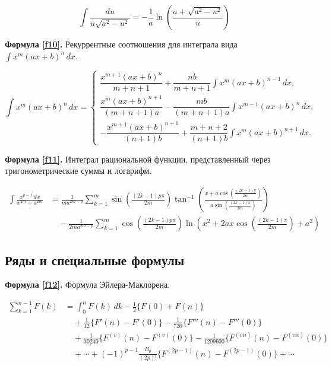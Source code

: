 \documentclass[a4paper,12pt]{article}
\begin{document}
\begin{equation}
\int \frac{du}{u\sqrt{a^2-u^2}}=-\frac{1}{a}\ln\left(\frac{a+\sqrt{a^2-u^2}}{u}\right)
\label{f9}
\end{equation}


\vspace{15pt}
\textbf{Формула \ref{f10}.}
Рекуррентные соотношения для интеграла вида $\int x^m(ax+b)^n\,dx$.

\begin{equation}
\int x^m(ax+b)^n\,dx=\begin{cases}\dfrac{x^{m+1}(ax+b)^n}{m+n+1}
+\dfrac{nb}{m+n+1}\int x^m(ax+b)^{n-1}\,dx, \\[10pt]\dfrac{x^m(ax+b)^{n+1}}{(m+n+1)a}
-\dfrac{mb}{(m+n+1)a}\int x^{m-1}(ax+b)^n\,dx, \\[10pt]
-\dfrac{x^{m+1}(ax+b)^{n+1}}{(n+1)b}
+\dfrac{m+n+2}{(n+1)b}\int x^m(ax+b)^{n+1}\,dx.
\end{cases}
\label{f10}
\end{equation}


\vspace{15pt}
\textbf{Формула \ref{f11}.}
Интеграл рациональной функции, представленный через тригонометрические суммы и логарифм.

\begin{equation}
\begin{split}
\int \frac{x^{p-1}\,dx}{x^{2m}+a^{2m}}&=\frac{1}{m a^{2m-p}}\sum_{k=1}^{m}
\sin\left(\frac{(2k-1)p\pi}{2m}\right)\tan^{-1}\left(\frac{x+a\cos\left(\frac{(2k-1)\pi}{2m}\right)}
{a\sin\left(\frac{(2k-1)\pi}{2m}\right)}\right)\\[8pt]
&\quad-\frac{1}{2m a^{2m-p}}\sum_{k=1}^{m}\cos\left(\frac{(2k-1)p\pi}{2m}\right)
\ln\left(x^2+2ax\cos\left(\frac{(2k-1)\pi}{2m}\right)+a^2\right)
\end{split}
\label{f11}
\end{equation}


\subsection{Ряды и специальные формулы}
\vspace{15pt}
\textbf{Формула \ref{f12}.}
Формула Эйлера-Маклорена.

\begin{equation}
\begin{split}
\sum_{k=1}^{n-1} F(k)&=\int_0^n F(k)\,dk-\frac{1}{2}\{F(0)+F(n)\}\\[6pt]&\quad
+\frac{1}{12}\{F'(n)-F'(0)\}-\frac{1}{720}\{F'''(n)-F'''(0)\}\\[6pt]&\quad+\frac{1}{30240}\{F^{(v)}(n)-F^{(v)}(0)\}
-\frac{1}{1209600}\{F^{(vii)}(n)-F^{(vii)}(0)\}\\[6pt]&\quad+\cdots+(-1)^{p-1}\frac{B_p}{(2p)!}
\{F^{(2p-1)}(n)-F^{(2p-1)}(0)\}+\cdots
\end{split}
\label{f12}
\end{equation}
\end{document}
